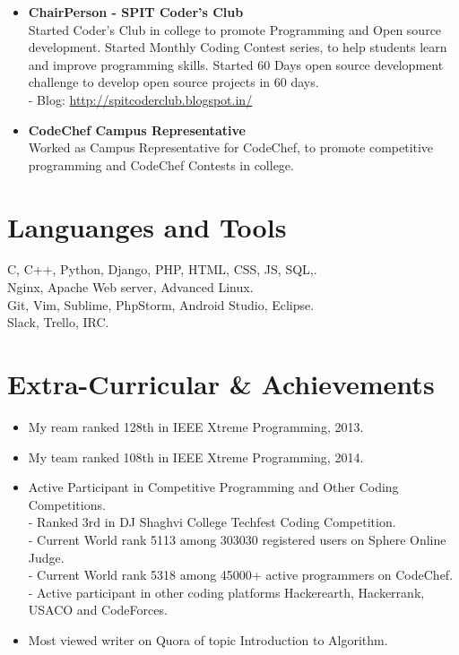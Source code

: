 \documentclass[margin,line]{res}
\begin{document}
\begin{resume}
\begin{itemize}
 
 \item\textbf{ChairPerson -  SPIT Coder's Club}\\
Started Coder's Club in college to promote Programming and Open source development. Started Monthly Coding Contest series, to help students learn and improve programming skills. Started 60 Days open source development challenge to develop open source projects in 60 days.\\
- Blog: \url{http://spitcoderclub.blogspot.in/}
\\
\item\textbf{CodeChef Campus Representative}\\
Worked as Campus Representative for CodeChef, to promote competitive programming and CodeChef Contests in college.
\end{itemize}


\section{Languanges and Tools}
C, C++, Python, Django, PHP, HTML, CSS, JS, SQL,.\\
Nginx, Apache Web server, Advanced Linux.\\ 
Git, Vim, Sublime, PhpStorm, Android Studio, Eclipse.\\
Slack, Trello, IRC.\\


\section{Extra-Curricular \& Achievements}

\begin{itemize} \itemsep -4pt
 \item My ream ranked 128th in IEEE Xtreme Programming, 2013.\\
 \item My team ranked 108th in IEEE Xtreme Programming, 2014. \\
 \item Active Participant in Competitive Programming and Other Coding Competitions. \\
 - Ranked 3rd in DJ Shaghvi College Techfest Coding Competition.\\
 - Current World rank 5113 among 303030 registered users on Sphere Online Judge. \\
 - Current World rank 5318 among 45000+ active programmers on CodeChef.\\
 - Active participant in other coding platforms Hackerearth, Hackerrank, USACO and CodeForces.\\
 \item Most viewed writer on Quora of topic Introduction to Algorithm.  
\end{itemize}





\end{resume}
\end{document}
